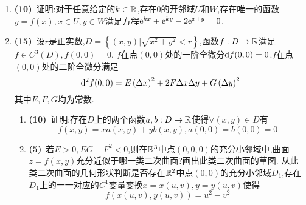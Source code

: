 \documentclass{ctexart}
\begin{document}
\begin{enumerate}[leftmargin=*,label=\textbf{\arabic*.}]
    \item \textbf{(10)}\ 证明:对于任意给定的$k\in\mathbb{R}$,存在$0$的开邻域$U$和$W$,存在唯一的函数$y=f(x),x\in U,y\in W$满足方程$\mathrm{e}^{kx}+\mathrm{e}^{ky}-2\mathrm{e}^{x+y}=0$.
    \item \textbf{(15)}\ 设$r$是正实数,$D=\left\{(x,y)\vert\sqrt{x^2+y^2}<r\right\}$,函数$f:D\to\mathbb{R}$满足$f\in C^3(D),f(0,0)=0$,
        $f$在点$(0,0)$处的一阶全微分$\mathrm{d} f(0,0)=0$.$f$在点$(0,0)$处的二阶全微分满足
        $$\mathrm{d}^2f(0,0)=E\left(\Delta x\right)^2+2F\Delta x\Delta y+G\left(\Delta y\right)^2$$
        其中$E,F,G$均为常数.
        \begin{enumerate}[label=\textbf{(\arabic*)},leftmargin=*]
            \item \textbf{(10)}\ 证明:存在$D$上的两个函数$a,b:D\to\mathbb{R}$使得$\forall (x,y)\in D$有$$f(x,y)=xa(x,y)+yb(x,y),a(0,0)=b(0,0)=0$$
            \item \textbf{(5)}\ 若$E>0,EG-F^2<0$,则在$\mathbb{R}^3$中点$(0,0,0)$的充分小邻域中,曲面$z=f(x,y)$充分近似于哪一类二次曲面?画出此类二次曲面的草图.
                从此类二次曲面的几何形状判断是否存在$\mathbb{R}^2$中点$(0,0)$的充分小邻域$D_1$,存在$D_1$上的一一对应的$C^1$变量变换$x=x(u,v),y=y(u,v)$使得
                $$f(x(u,v),y(u,v))=u^2-v^2$$
        \end{enumerate}
\end{enumerate}
\end{document}
